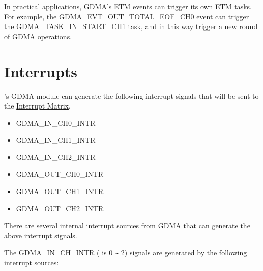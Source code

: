 \documentclass[main\_\_EN.tex]{subfiles}
\begin{document}
In practical applications, GDMA's ETM events can trigger its own ETM tasks. For example, the GDMA\_EVT\_OUT\_TOTAL\_EOF\_CH0 event can trigger the GDMA\_TASK\_IN\_START\_CH1 task, and in this way trigger a new round of GDMA operations.

\section{Interrupts}

\chipname{}'s GDMA module can generate the following interrupt signals that will be sent to the \hyperref[mod:intmtrx]{Interrupt Matrix}.

    \begin{itemize}
        \item GDMA\_IN\_CH0\_INTR
        \item GDMA\_IN\_CH1\_INTR
        \item GDMA\_IN\_CH2\_INTR
        \item GDMA\_OUT\_CH0\_INTR
        \item GDMA\_OUT\_CH1\_INTR
        \item GDMA\_OUT\_CH2\_INTR
    \end{itemize}

There are several internal interrupt sources from GDMA that can generate the above interrupt signals.

The GDMA\_IN\_CH\_INTR ( is 0 \verb+~+ 2) signals are generated by the following interrupt sources:
\end{document}
